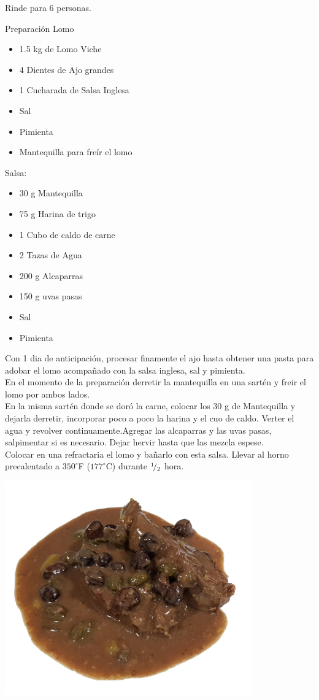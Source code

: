 
Rinde para 6 personas.

\begin{ingredientes}
\item  Preparación Lomo
\begin{itemize}
\item 1.5 kg de Lomo Viche
\item 4 Dientes de Ajo grandes
\item 1 Cucharada de Salsa Inglesa
\item Sal
\item Pimienta
\item Mantequilla para freír el lomo
\end{itemize}
\item Salsa:
\begin{itemize}
\item 30 g Mantequilla
\item 75 g Harina de trigo
\item 1 Cubo de caldo de carne
\item 2 Tazas de Agua
\item 200 g Alcaparras 
\item 150 g uvas pasas
\item Sal
\item Pimienta
\end{itemize}

\end{ingredientes}
\preparacion
Con 1 dia de anticipación, procesar finamente el ajo hasta obtener una pasta para adobar el lomo acompañado con la salsa inglesa, sal y pimienta.\\

En el momento de la preparación derretir la mantequilla en una sartén y freir el lomo por ambos lados.\\

En la misma sartén donde se doró la carne, colocar los 30 g de Mantequilla y dejarla derretir,  incorporar poco a poco la harina y el cuo de caldo. Verter el agua y revolver continuamente.Agregar las alcaparras y las uvas pasas, salpimentar si es necesario. Dejar hervir hasta que las mezcla espese.\\

Colocar en una refractaria el lomo y bañarlo con esta salsa. Llevar al horno precalentado a $350^\circ$F ($177^\circ$C) durante ${}^{1}\!/_{2}$ hora.

\begin{center}
\includegraphics[width=0.8\textwidth]{fotos/lomito_alcaparrado.jpg}
\end{center}